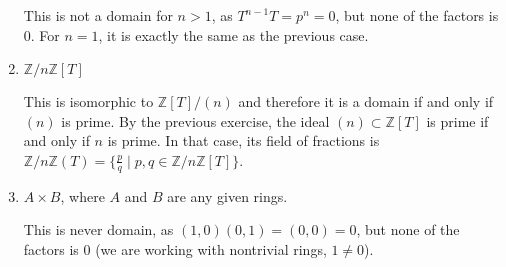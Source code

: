 \begin{problem}
\begin{enumerate}
\begin{sol}
            This is not a domain for $n > 1$, as $T^{n-1}T = p^n = 0$,
            but none of the factors is $0$.
            For $n = 1$, it is exactly the same as the previous case.
        \end{sol}
        \item $\mathbb{Z}/n\mathbb{Z}[T]$
        \begin{sol}
            This is isomorphic to $\mathbb{Z}[T]/(n)$
            and therefore it is a domain if and only if $(n)$ is prime.
            By the previous exercise, the ideal $(n)\subset\mathbb{Z}[T]$
            is prime if and only if $n$ is prime.
            In that case, its field of fractions is $\mathbb{Z}/n\mathbb{Z}(T)
            = \{\frac{p}{q} \mid p, q \in \mathbb{Z}/n\mathbb{Z}[T]\}$.
        \end{sol}
        \item $A \times B$, where $A$ and $B$ are any given rings.
        \begin{sol}
            This is never domain,
            as $(1, 0)(0, 1) = (0, 0) = 0$,
            but none of the factors is $0$ (we are working with nontrivial rings, $1 \neq 0$).
        \end{sol}
    \end{enumerate}
\end{problem}